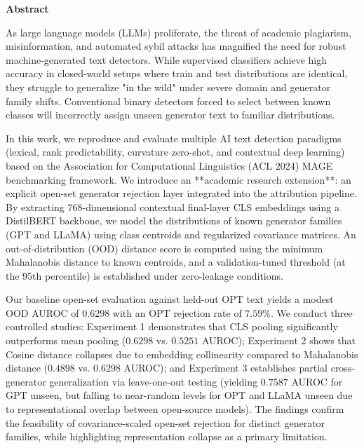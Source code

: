\begin{center}
{\LARGE \bf Abstract}
\end{center}
\noindent As large language models (LLMs) proliferate, the threat of academic plagiarism, misinformation, and automated sybil attacks has magnified the need for robust machine-generated text detectors. While supervised classifiers achieve high accuracy in closed-world setups where train and test distributions are identical, they struggle to generalize "in the wild" under severe domain and generator family shifts. Conventional binary detectors forced to select between known classes will incorrectly assign unseen generator text to familiar distributions.

In this work, we reproduce and evaluate multiple AI text detection paradigms (lexical, rank predictability, curvature zero-shot, and contextual deep learning) based on the Association for Computational Linguistics (ACL 2024) MAGE benchmarking framework. We introduce an **academic research extension**: an explicit open-set generator rejection layer integrated into the attribution pipeline. By extracting 768-dimensional contextual final-layer CLS embeddings using a DistilBERT backbone, we model the distributions of known generator families (GPT and LLaMA) using class centroids and regularized covariance matrices. An out-of-distribution (OOD) distance score is computed using the minimum Mahalanobis distance to known centroids, and a validation-tuned threshold (at the 95th percentile) is established under zero-leakage conditions.

Our baseline open-set evaluation against held-out OPT text yields a modest OOD AUROC of $0.6298$ with an OPT rejection rate of $7.59\%$. We conduct three controlled studies: Experiment 1 demonstrates that CLS pooling significantly outperforms mean pooling ($0.6298$ vs. $0.5251$ AUROC); Experiment 2 shows that Cosine distance collapses due to embedding collinearity compared to Mahalanobis distance ($0.4898$ vs. $0.6298$ AUROC); and Experiment 3 establishes partial cross-generator generalization via leave-one-out testing (yielding $0.7587$ AUROC for GPT unseen, but falling to near-random levels for OPT and LLaMA unseen due to representational overlap between open-source models). The findings confirm the feasibility of covariance-scaled open-set rejection for distinct generator families, while highlighting representation collapse as a primary limitation.